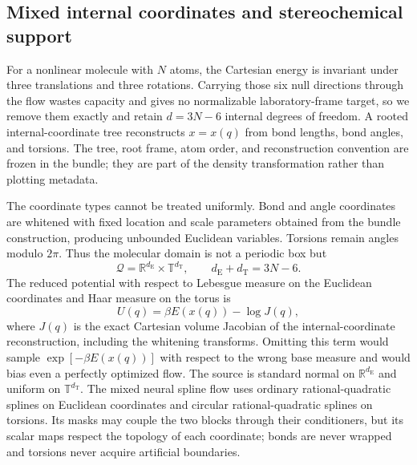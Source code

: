 \documentclass{article}
\begin{document}
\subsection{Mixed internal coordinates and stereochemical support}
\label{sec: mol-coordinates}

For a nonlinear molecule with \(N\) atoms, the Cartesian energy is invariant under three translations and three rotations. Carrying those six null directions through the flow wastes capacity and gives no normalizable laboratory-frame target, so we remove them exactly and retain \(d=3N-6\) internal degrees of freedom. A rooted internal-coordinate tree reconstructs \(x=x(q)\) from bond lengths, bond angles, and torsions. The tree, root frame, atom order, and reconstruction convention are frozen in the bundle; they are part of the density transformation rather than plotting metadata.

The coordinate types cannot be treated uniformly. Bond and angle coordinates are whitened with fixed location and scale parameters obtained from the bundle construction, producing unbounded Euclidean variables. Torsions remain angles modulo \(2\pi\). Thus the molecular domain is not a periodic box but
\begin{equation}
\mathcal Q=\mathbb R^{d_{\mathrm E}}\times\mathbb T^{d_{\mathrm T}},
\qquad d_{\mathrm E}+d_{\mathrm T}=3N-6 .
\label{eq: mixed-molecular-domain}
\end{equation}
The reduced potential with respect to Lebesgue measure on the Euclidean coordinates and Haar measure on the torus is
\begin{equation}
U(q)=\beta E(x(q))-\log J(q),
\label{eq: molecular-reduced-potential}
\end{equation}
where \(J(q)\) is the exact Cartesian volume Jacobian of the internal-coordinate reconstruction, including the whitening transforms. Omitting this term would sample \(\exp[-\beta E(x(q))]\) with respect to the wrong base measure and would bias even a perfectly optimized flow. The source is standard normal on \(\mathbb R^{d_{\mathrm E}}\) and uniform on \(\mathbb T^{d_{\mathrm T}}\). The mixed neural spline flow uses ordinary rational-quadratic splines on Euclidean coordinates and circular rational-quadratic splines on torsions. Its masks may couple the two blocks through their conditioners, but its scalar maps respect the topology of each coordinate; bonds are never wrapped and torsions never acquire artificial boundaries.
\end{document}
